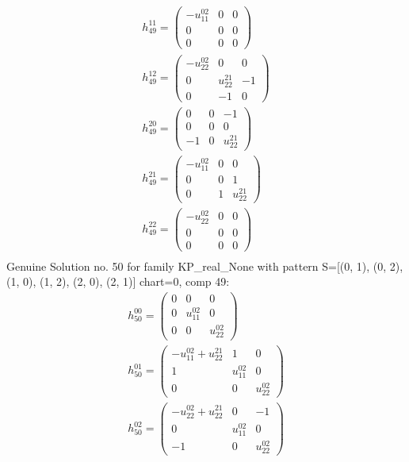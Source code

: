 \documentclass[a4paper, 11pt, twoside, onecolumn]{article}
\begin{document}
\begin{landscape}
\begin{gather*}
	 h_{49}^{11}=\begin{pmatrix}- u^{02}_{11} & 0 & 0\\0 & 0 & 0\\0 & 0 & 0\end{pmatrix}\\ 
	 h_{49}^{12}=\begin{pmatrix}- u^{02}_{22} & 0 & 0\\0 & u^{21}_{22} & -1\\0 & -1 & 0\end{pmatrix}\\ 
	 h_{49}^{20}=\begin{pmatrix}0 & 0 & -1\\0 & 0 & 0\\-1 & 0 & u^{21}_{22}\end{pmatrix}\\ 
	 h_{49}^{21}=\begin{pmatrix}- u^{02}_{11} & 0 & 0\\0 & 0 & 1\\0 & 1 & u^{21}_{22}\end{pmatrix}\\ 
	 h_{49}^{22}=\begin{pmatrix}- u^{02}_{22} & 0 & 0\\0 & 0 & 0\\0 & 0 & 0\end{pmatrix}\\ 
\end{gather*} 
Genuine Solution no. 50 for family KP_real_None with pattern S=[(0, 1), (0, 2), (1, 0), (1, 2), (2, 0), (2, 1)] chart=0, comp 49: 
\begin{gather*} 
	 h_{50}^{00}=\begin{pmatrix}0 & 0 & 0\\0 & u^{02}_{11} & 0\\0 & 0 & u^{02}_{22}\end{pmatrix}\\ 
	 h_{50}^{01}=\begin{pmatrix}- u^{02}_{11} + u^{21}_{22} & 1 & 0\\1 & u^{02}_{11} & 0\\0 & 0 & u^{02}_{22}\end{pmatrix}\\ 
	 h_{50}^{02}=\begin{pmatrix}- u^{02}_{22} + u^{21}_{22} & 0 & -1\\0 & u^{02}_{11} & 0\\-1 & 0 & u^{02}_{22}\end{pmatrix}\\ 

\end{gather*}
\end{landscape}
\end{document}
